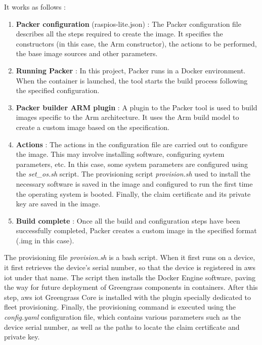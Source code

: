 It works as follows :
\begin{enumerate}
    \item \textbf{Packer configuration} (raspios-lite.json) : The Packer configuration file describes all the steps required to create the image. It specifies the constructors (in this case, the Arm constructor), the actions to be performed, the base image sources and other parameters.
    \item \textbf{Running Packer} : In this project, Packer runs in a Docker environment. When the container is launched, the tool starts the build process following the specified configuration.
    \item \textbf{Packer builder ARM plugin} : A plugin \cite{packer_plugin} to the Packer tool is used to build images specific to the Arm architecture. It uses the Arm build model to create a custom image based on the specification.
    \item \textbf{Actions} : The actions in the configuration file are carried out to configure the image. This may involve installing software, configuring system parameters, etc. In this case, some system parameters are configured using the \textit{set\_os.sh} script. The \gls{provisioning} script \textit{provision.sh} used to install the necessary software is saved in the image and configured to run the first time the operating system is booted. Finally, the claim certificate and its private key are saved in the image.
    \item \textbf{Build complete} : Once all the build and configuration steps have been successfully completed, Packer creates a custom image in the specified format (.img in this case).
\end{enumerate}

The \gls{provisioning} file \textit{provision.sh} is a bash script. When it first runs on a device, it first retrieves the device's serial number, so that the device is registered in \gls{aws} \acrshort{iot} under that name. The script then installs the Docker Engine software, paving the way for future deployment of Greengrass components in containers. After this step, \gls{aws} \acrshort{iot} Greengrass Core is installed with the plugin specially dedicated to fleet \gls{provisioning}. Finally, the \gls{provisioning} command is executed using the \textit{config.yaml} configuration file, which contains various parameters such as the device serial number, as well as the paths to locate the claim certificate and private key.

